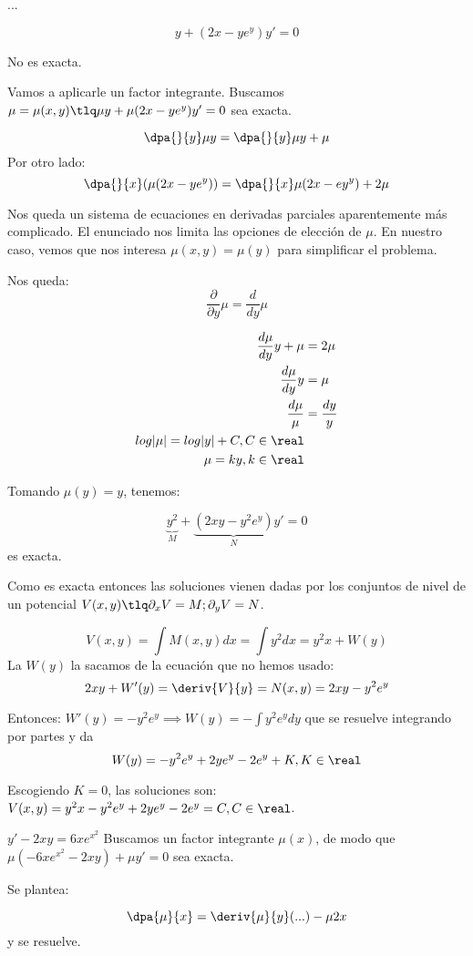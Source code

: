 \documentclass[nochap]{apuntes}
\begin{document}
\begin{problem}[12]
\ppart
\ppart
\ppart
\ppart ...

\solution

\spart
\spart
\spart
\spart \[y+(2x - ye^y)y' = 0\]

No es exacta. 

Vamos a aplicarle un factor integrante. Buscamos $\mu=\mu(x,y) \tlq \mu y+ \mu(2x-ye^y)y'=0$ sea exacta.

\[\dpa{}{y}\mu y = \dpa{}{y} \mu y + \mu\]
Por otro lado:
\[\dpa{}{x}(\mu(2x-ye^y)) = \dpa{}{x}\mu(2x-ey^y)+2\mu\]

Nos queda un sistema de ecuaciones en derivadas parciales aparentemente más complicado. El enunciado nos limita las opciones de elección de $\mu$. En nuestro caso, vemos que nos interesa $\mu(x,y) = \mu(y)$ para simplificar el problema.

Nos queda: \[\frac{\partial}{\partial y} \mu = \frac{d}{dy}\mu\]

\begin{align*}
\frac{d\mu}{dy}y+\mu&=2\mu\\
\frac{d\mu}{dy}y&=\mu\\
\frac{d\mu}{\mu} &= \frac{dy}{y}\\
log|\mu| = log|y| + C, C\in\real\\
\mu=ky,k\in\real
\end{align*}

Tomando $\mu(y)=y$, tenemos:

\[\underbrace{y^2}_{M}+\underbrace{(2xy-y^2e^y)}_{N}y'=0\] es exacta. 


Como es exacta entonces las soluciones vienen dadas por los conjuntos de nivel de un potencial $V(x,y) \tlq \partial_xV=M;\partial_yV=N$.

\[V(x,y) = \int M(x,y)dx = \int y^2 dx = y^2x + W(y)\]
La $W(y)$ la sacamos de la ecuación que no hemos usado:
\[2xy+W'(y) = \deriv{V}{y} = N(x,y) = 2xy-y^2e^y\]

Entonces: $W'(y) = -y^2e^y \implies W(y) =- \int y^2e^ydy$ que se resuelve integrando por partes y da \[W(y) = -y^2e^y + 2ye^y - 2e^y+K,K\in\real\]

Escogiendo $K=0$, las soluciones son: $V(x,y) = y^2x-y^2e^y + 2ye^y - 2e^y = C, C\in\real$.
\end{problem}

\begin{problem}[nose]
$y'-2xy=6xe^{x^2}$
\solution
Buscamos un factor integrante $\mu(x)$, de modo que $\displaystyle\mu( - 6xe^{x^2} - 2xy) + \mu y' = 0 $ sea exacta.

Se plantea:

\[\dpa{\mu}{x} = \deriv{\mu}{y}(...) - \mu 2 x\]
y se resuelve.

\end{problem}
\end{document}
